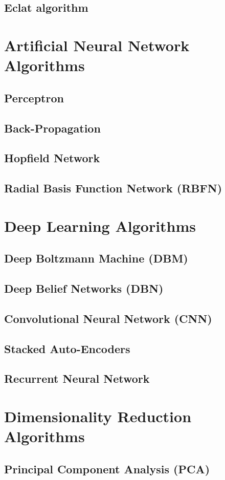 \documentclass[14pt]{book}
\begin{document}
\section{Eclat algorithm}
\chapter{Artificial Neural Network Algorithms}
\section{Perceptron}
\section{Back-Propagation}
\section{Hopfield Network}
\section{Radial Basis Function Network (RBFN)}
\chapter{Deep Learning Algorithms}
\section{Deep Boltzmann Machine (DBM)}
\section{Deep Belief Networks (DBN)}
\section{Convolutional Neural Network (CNN)}
\section{Stacked Auto-Encoders}
\section{Recurrent Neural Network}
\chapter{Dimensionality Reduction Algorithms}
\section{Principal Component Analysis (PCA)}
\end{document}
